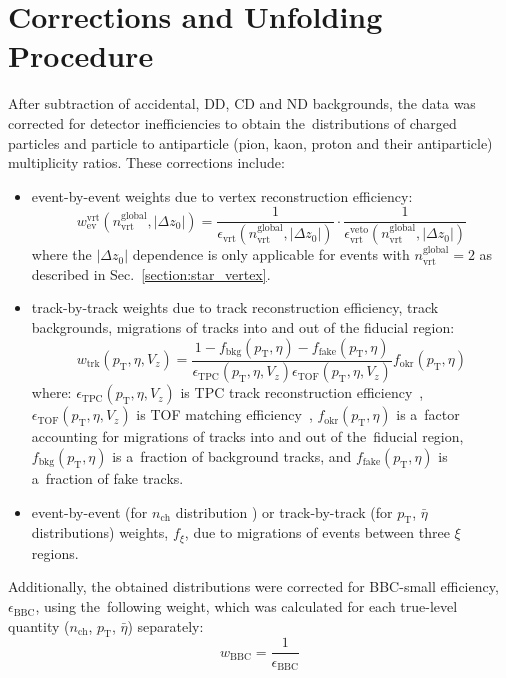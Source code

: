 \chapter{Corrections and Unfolding Procedure}\label{section:star_corrections}
After subtraction of accidental, \ac{DD}, \ac{CD} and \ac{ND} backgrounds, the data was corrected for detector inefficiencies to obtain the~distributions of charged particles and particle to antiparticle (pion, kaon, proton and their antiparticle) multiplicity ratios. These corrections include:
\begin{itemize}
	\item event-by-event weights due to vertex reconstruction efficiency:
\begin{equation}
w_\textrm{ev}^\textrm{vrt}\left(n_\textrm{vrt}^\textrm{global}, |\Delta z_0|\right)=\frac{1}{\epsilon_\textrm{vrt}\left(n_\textrm{vrt}^\textrm{global}, |\Delta z_0|\right)}\cdot\frac{1}{\epsilon_\textrm{vrt}^\textrm{veto}\left(n_\textrm{vrt}^\textrm{global}, |\Delta z_0|\right)}
\label{eq:vertexCorrection}
\end{equation}
where the 	$|\Delta z_0|$ dependence is only applicable for events with $n_\textrm{vrt}^\textrm{global}=2$ as described in Sec.~\ref{section:star_vertex}.
	\item track-by-track weights due to track reconstruction efficiency, track backgrounds, migrations of tracks into and out of the fiducial region:
\begin{equation}
w_\textrm{trk}\left(p_\textrm{T},\eta,V_{z}\right)=\frac{1-f_\textrm{bkg}\left(p_\textrm{T},\eta\right)-f_\textrm{fake}\left(p_\textrm{T},\eta\right)}{\epsilon_\textrm{TPC}\left(p_\textrm{T},\eta,V_{z}\right)\epsilon_\textrm{TOF}\left(p_\textrm{T},\eta,V_{z}\right)}f_\textrm{okr}\left(p_\textrm{T},\eta\right)
\label{eq:trackCorrection}
\end{equation}
where: $\epsilon_\textrm{TPC}\left(p_\textrm{T},\eta,V_{z}\right)$ is TPC track reconstruction efficiency~\cite{supplementaryNote}, $\epsilon_\textrm{TOF}\left(p_\textrm{T},\eta,V_{z}\right)$ is TOF matching efficiency~\cite{supplementaryNote}, $f_\textrm{okr}\left(p_\textrm{T},\eta\right)$ is a~factor accounting for migrations of tracks into and out of the~fiducial region, $f_\textrm{bkg}\left(p_\textrm{T},\eta\right)$ is a~fraction of background tracks, and $f_\textrm{fake}\left(p_\textrm{T},\eta\right)$ is a~fraction of fake tracks.
\item event-by-event (for $n_\textrm{ch}$ distribution ) or track-by-track (for $p_\textrm{T}$, $\bar{\eta}$ distributions) weights, $f_{\xi}$, due to migrations of events between three $\xi$ regions.
\end{itemize}
Additionally, the obtained distributions were corrected for BBC-small efficiency, $\epsilon_\textrm{BBC}$, using the~following weight, which was calculated for each true-level quantity ($n_\textrm{ch}$, $p_\textrm{T}$, $\bar{\eta}$) separately:
\begin{equation}
w_\textrm{BBC} = \frac{1}{\epsilon_\textrm{BBC}}
\label{eq:bbcCorrection}
\end{equation} 

